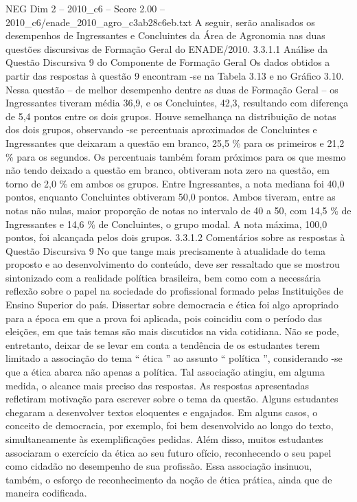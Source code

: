\begin{textsample}{NEG Dim 2 – 2010\_c6 – Score 2.00 – 2010\_c6/enade\_2010\_agro\_c3ab28c6eb.txt}
A seguir, serão analisados os desempenhos de Ingressantes e Concluintes da Área de Agronomia nas duas questões discursivas de Formação Geral do ENADE/2010. 3.3.1.1 Análise da Questão Discursiva 9 do Componente de Formação Geral Os dados obtidos a partir das respostas à questão 9 encontram -se na Tabela 3.13 e no Gráfico 3.10.
Nessa questão – de melhor desempenho dentre as duas de Formação Geral – os Ingressantes tiveram média 36,9, e os Concluintes, 42,3, resultando com diferença de 5,4 pontos entre os dois grupos.
Houve semelhança na distribuição de notas dos dois grupos, observando -se percentuais aproximados de Concluintes e Ingressantes que deixaram a questão em branco, 25,5 \% para os primeiros e 21,2 \% para os segundos.
Os percentuais também foram próximos para os que mesmo não tendo deixado a questão em branco, obtiveram nota zero na questão, em torno de 2,0 \% em ambos os grupos.
Entre Ingressantes, a nota mediana foi 40,0 pontos, enquanto Concluintes obtiveram 50,0 pontos.
Ambos tiveram, entre as notas não nulas, maior proporção de notas no intervalo de 40 a 50, com 14,5 \% de Ingressantes e 14,6 \% de Concluintes, o grupo modal.
A nota máxima, 100,0 pontos, foi alcançada pelos dois grupos. 3.3.1.2 Comentários sobre as respostas à Questão Discursiva 9 No que tange mais precisamente à atualidade do tema proposto e ao desenvolvimento do conteúdo, deve ser ressaltado que se mostrou sintonizado com a realidade política brasileira, bem como com a necessária reflexão sobre o papel na sociedade do profissional formado pelas Instituições de Ensino Superior do país.
Dissertar sobre democracia e ética foi algo apropriado para a época em que a prova foi aplicada, pois coincidiu com o período das eleições, em que tais temas são mais discutidos na vida cotidiana.
Não se pode, entretanto, deixar de se levar em conta a tendência de os estudantes terem limitado a associação do tema “ ética ” ao assunto “ política ”, considerando -se que a ética abarca não apenas a política.
Tal associação atingiu, em alguma medida, o alcance mais preciso das respostas.
As respostas apresentadas refletiram motivação para escrever sobre o tema da questão.
Alguns estudantes chegaram a desenvolver textos eloquentes e engajados.
Em alguns casos, o conceito de democracia, por exemplo, foi bem desenvolvido ao longo do texto, simultaneamente às exemplificações pedidas.
Além disso, muitos estudantes associaram o exercício da ética ao seu futuro ofício, reconhecendo o seu papel como cidadão no desempenho de sua profissão.
Essa associação insinuou, também, o esforço de reconhecimento da noção de ética prática, ainda que de maneira codificada.

\end{textsample}
